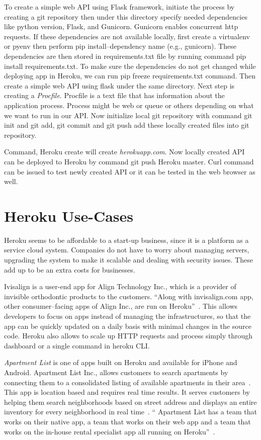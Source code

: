  To create a simple web API using Flask framework, initiate the process
 by creating a git repository then under this directory specify needed
 dependencies like python version, Flask, and Gunicorn. Gunicorn
 enables concurrent  http requests. If these
 dependencies are not available locally, first create a virtualenv or
 pyenv then perform pip install--dependency name (e.g., gunicorn). 
 These dependencies are
 then stored in requirements.txt file by running  command pip install 
 requirements.txt. To make sure the dependencies do
 not get changed while deploying app in Heroku, we can run pip freeze
 requirements.txt command. Then create a simple web API using flask under the same
 directory. Next step is creating a \textit{Procfile}. Procfile is a text file
 that has information
 about the application process. Process might be web or queue or others depending on 
 what we want to run in our API. Now initialize local git repository with command
 git init and git add, git commit and git push add these locally created files 
 into git repository.

 Command, Heroku create will create \textit{herokuapp.com}. Now locally created API
 can be deployed to Heroku by command git push Heroku master. Curl command
 can be issued to test newly created API or it can be tested in the web
 browser as well.


\section{Heroku Use-Cases}

 Heroku seems to be affordable to a start-up business, since it is a platform
 as a service cloud system. Companies do not have to worry about managing
 servers, upgrading the system to make it scalable and dealing with security
 issues. These add up to be an extra costs for businesses. 

 Ivisalign is a user-end app for Align Technology Inc., which is a provider of
 invisible orthodontic products to the customers. ``Along with invisalign.com app,
 other consumer--facing apps of Align Inc., are run on
 Heroku''~\cite{hid-sp18-415-www-customers-heroku-com}. This allows developers to focus
 on apps instead of managing the infrastructures, so that the app can be quickly
 updated on a daily basis with minimal changes in the source code. Heroku also
 allows to scale up HTTP requests and process simply through dashboard or a
 single command in heroku CLI. 

 \textit{Apartment List} is one of apps built on Heroku and available for iPhone and
 Android. Apartment List Inc., allows customers to search apartments by
 connecting them to a consolidated listing of available apartments in
 their area~\cite{hid-sp18-415-www-customers-heroku-com}. This app is location based
 and requires real time results. It serves customers by helping them search
 neighborhoods based on street address and displays an entire inventory for
 every neighborhood in real time~\cite{hid-sp18-415-www-customers-heroku-com}.
 `` Apartment List has a team that works on their native app, a team
 that works on their web app and a team that works on the in-house rental
 specialist app  all running on Heroku''~\cite{hid-sp18-415-www-customers-heroku-com}.

